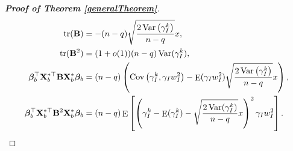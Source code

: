 \documentclass[11pt]{article}
\DeclareMathOperator{\mytr}{tr}
\DeclareMathOperator{\myE}{E}
\DeclareMathOperator{\myVar}{Var}
\DeclareMathOperator{\myCov}{Cov}
\newcommand{\bfsym}[1]{\ensuremath{\boldsymbol{#1}}}
\def\bbeta{\bfsym \beta}
\theoremstyle{plain}
\theoremstyle{definition}
\theoremstyle{remark}
\begin{document}
\begin{proof}[\textbf{Proof of Theorem \ref{generalTheorem}}]
\begin{align*}
    \mytr(\BB)
    &=
    -(n-q)
     \sqrt{
         \frac{
             2\myVar\left( \gamma_I^k \right)
         }{
             n-q
         }
    } 
    x,
    \\
    \mytr(\BB^2) &= (1+o(1)) ( n-q ) \myVar ( \gamma_I^k ),
    \\
        \bbeta_b^\top
        \BX_b^{*\top}
        \BB
        \BX_b^*
        \bbeta_b
        &= 
        (n-q)\left( 
            \myCov\left( \gamma_I^k, \gamma_I w_I^2 \right)
            -
            \myE (\gamma_I w_I^2)
            \sqrt{\frac{2\myVar\left( \gamma_I^k \right)}{n-q}} 
            x
        \right),
    \\
        \bbeta_b^\top
        \BX_b^{*\top}
        \BB^2
        \BX_b^*
        \bbeta_b
    &=
    (n-q) \myE\left[ 
        \left( \gamma_I^k -\myE(\gamma_I^k) -\sqrt{\frac{2\myVar (\gamma_I^k)}{n-q}}x \right)^2
        \gamma_I w_I^2
    \right]
    .
\end{align*}



\end{proof}





 








\end{document}
